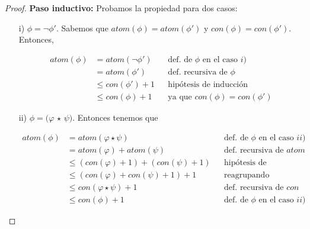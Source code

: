 \documentclass[letterpaper,11pt]{article}
\begin{document}
\begin{enumerate}
\begin{proof}
        \justify
        \textbf{Paso inductivo:} Probamos la propiedad para dos casos:
        
        \begin{itemize}
            \item[i)] $\phi = \neg \phi'$. Sabemos que  
            $atom(\phi) = atom(\phi')$ y $con(\phi) = con(\phi')$. Entonces, 
            
            \begin{align*}
                atom(\phi) &= atom(\neg \phi')
                           && \text{def. de $\phi$ en el caso $i$)} \\
                           &= atom(\phi')
                           && \text{def. recursiva de $\phi$} \\
                           &\leq con(\phi') + 1
                           && \text{hipótesis de inducción} \\
                           &\leq con(\phi) + 1
                           && \text{ya que $con(\phi) = con(\phi')$}
            \end{align*} 

            \item[ii)] $\phi = (\varphi$ $\star$ $\psi)$. Entonces tenemos que 
            
            \begin{align*}
                atom(\phi) &= atom(\varphi \star \psi) 
                           && \text{def. de $\phi$ en el caso $ii)$} \\ 
                           &= atom(\varphi) + atom(\psi)
                           && \text{def. recursiva de $atom$} \\
                           &\leq (con(\varphi) + 1) + (con(\psi) + 1)
                           && \text{hipótesis de inducción} \\
                           &\leq (con(\varphi) + con(\psi) + 1) + 1
                           && \text{reagrupando} \\
                           &\leq con (\varphi \star \psi) + 1
                           && \text{def. recursiva de $con$} \\
                           &\leq con(\phi) + 1
                           && \text{def. de $\phi$ en el caso $ii)$}
            \end{align*}
        \end{itemize} 
    \end{proof}
\end{enumerate}
\end{document}
